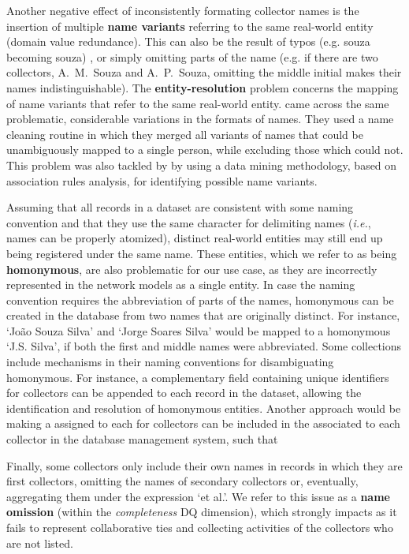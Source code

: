 Another negative effect of inconsistently formating collector names is the insertion of multiple \textbf{name variants} referring to the same real-world entity (domain value redundance).
This can also be the result of typos (e.g. souza becoming souza) , or simply omitting parts of the name (e.g. if there are two collectors, A.~M.~Souza and A.~P.~Souza, omitting the middle initial makes their names indistinguishable).
%
The \textbf{entity-resolution} problem concerns the mapping of name variants that refer to the same real-world entity.
 came across the same problematic, considerable variations in the formats of names.
They used a name cleaning routine in which they merged all variants of names that could be unambiguously mapped to a single person, while excluding those which could not.
This problem was also tackled by  by using a data mining methodology, based on association rules analysis, for identifying possible name variants.

Assuming that all records in a dataset are consistent with some naming convention and that they use the same character for delimiting names (\textit{i.e.}, names can be properly atomized), distinct real-world entities may still end up being registered under the same name.
These entities, which we refer to as being \textbf{homonymous}, are also problematic for our use case, as they are incorrectly represented in the network models as a single entity.
In case the naming convention requires the abbreviation of parts of the names, homonymous can be created in the database from two names that are originally distinct.
For instance, `João Souza Silva' and `Jorge Soares Silva' would be mapped to a homonymous `J.S. Silva', if both the first and middle names were abbreviated.
%
Some collections include mechanisms in their naming conventions for disambiguating homonymous.
For instance, a complementary field containing unique identifiers for collectors can be appended to each record in the dataset, allowing the identification and resolution of homonymous entities.
Another approach would be making a
assigned to each for collectors can be included in the associated to each collector in the database management system, such that 


Finally, some collectors only include their own names in records in which they are first collectors, omitting the names of secondary collectors or, eventually, aggregating them under the expression `et al.'.
We refer to this issue as a \textbf{name omission} (within the \textit{completeness} DQ dimension), which strongly impacts as it fails to represent collaborative ties and collecting activities of the collectors who are not listed.

